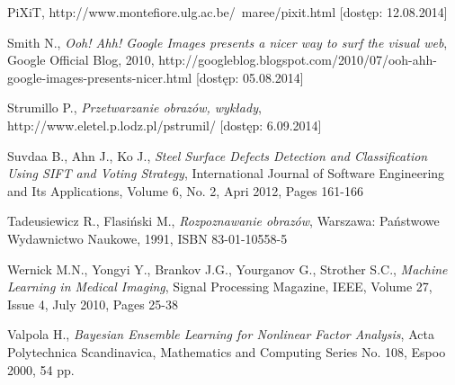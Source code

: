 \begin{thebibliography}{100}
 PiXiT, http://www.montefiore.ulg.ac.be/~maree/pixit.html [dostęp: 12.08.2014]

 Smith N., \emph{Ooh! Ahh! Google Images presents a nicer way to surf the visual web}, Google Official Blog, 2010, http://googleblog.blogspot.com/2010/07/ooh-ahh-google-images-presents-nicer.html [dostęp: 05.08.2014]

 Strumillo P., \emph{Przetwarzanie obrazów, wykłady}, http://www.eletel.p.lodz.pl/pstrumil/ [dostęp: 6.09.2014]

 Suvdaa B., Ahn J., Ko J., \emph{Steel Surface Defects Detection and Classification Using SIFT and Voting Strategy}, International Journal of Software Engineering and Its Applications, Volume 6, No. 2, Apri 2012, Pages 161-166

 Tadeusiewicz R., Flasiński M., \emph{Rozpoznawanie obrazów}, Warszawa: Państwowe Wydawnictwo Naukowe, 1991, ISBN 83-01-10558-5

 Wernick M.N., Yongyi Y., Brankov J.G., Yourganov G., Strother S.C., \emph{Machine Learning in Medical Imaging}, Signal Processing Magazine, IEEE, Volume 27,  Issue 4, July 2010, Pages 25-38

 Valpola H., \emph{Bayesian Ensemble Learning for Nonlinear Factor Analysis}, Acta Polytechnica Scandinavica, Mathematics and Computing Series No. 108, Espoo 2000, 54 pp.
 
\end{thebibliography} 